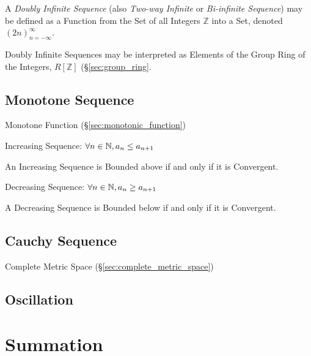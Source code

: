 A \emph{Doubly Infinite Sequence} (also \emph{Two-way Infinite} or
\emph{Bi-infinite Sequence}) may be defined as a Function from the Set
of all Integers $\mathbb{Z}$ into a Set, denoted
$(2n)^{\infty}_{n=-\infty}$.

Doubly Infinite Sequences may be interpreted as Elements of the Group
Ring of the Integers, $R[\mathbb{Z}]$ (\S\ref{sec:group_ring}.



\subsection{Monotone Sequence}\label{sec:monotone_sequence}

Monotone Function (\S\ref{sec:monotonic_function})

Increasing Sequence: $\forall n \in \mathbb{N}, a_n \leq a_{n+1}$

An Increasing Sequence is Bounded above if and only if it is
Convergent.

Decreasing Sequence: $\forall n \in \mathbb{N}, a_n \geq a_{n+1}$

A Decreasing Sequence is Bounded below if and only if it is
Convergent.



\subsection{Cauchy Sequence}\label{sec:cauchy_sequence}

Complete Metric Space (\S\ref{sec:complete_metric_space})



\subsection{Oscillation}\label{sec:oscillation}



\section{Summation}\label{sec:summation}

